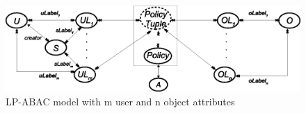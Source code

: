 
 	\begin{figure} 
 		\centering
 		\includegraphics[width=.9\textwidth]{epabac-mn}
 		\caption{LP-ABAC model with m user and n object attributes}
 		\label{fig:direction-of-implication}
 	\end{figure}
